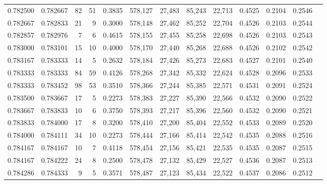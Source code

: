 \begin{tabular}{rrrrrrrrrrrrr}
0.782500 & 0.782667 &    82 &  51 &                                     0.3835 & 578,127 &  27,483 &  85,243 &  22,713 & 0.4525 & 0.2104 & 0.2546 \\
0.782667 & 0.782833 &    21 &   9 &                                     0.3000 & 578,148 &  27,462 &  85,252 &  22,704 & 0.4526 & 0.2103 & 0.2544 \\
0.782857 & 0.782976 &     7 &   6 &                                     0.4615 & 578,155 &  27,455 &  85,258 &  22,698 & 0.4526 & 0.2103 & 0.2543 \\
0.783000 & 0.783101 &    15 &  10 &                                     0.4000 & 578,170 &  27,440 &  85,268 &  22,688 & 0.4526 & 0.2102 & 0.2542 \\
0.783167 & 0.783333 &    14 &   5 &                                     0.2632 & 578,184 &  27,426 &  85,273 &  22,683 & 0.4527 & 0.2101 & 0.2540 \\
0.783333 & 0.783333 &    84 &  59 &                                     0.4126 & 578,268 &  27,342 &  85,332 &  22,624 & 0.4528 & 0.2096 & 0.2533 \\
0.783333 & 0.783452 &    98 &  53 &                                     0.3510 & 578,366 &  27,244 &  85,385 &  22,571 & 0.4531 & 0.2091 & 0.2524 \\
0.783500 & 0.783667 &    17 &   5 &                                     0.2273 & 578,383 &  27,227 &  85,390 &  22,566 & 0.4532 & 0.2090 & 0.2522 \\
0.783667 & 0.783833 &    10 &   6 &                                     0.3750 & 578,393 &  27,217 &  85,396 &  22,560 & 0.4532 & 0.2090 & 0.2521 \\
0.783833 & 0.784000 &    17 &   8 &                                     0.3200 & 578,410 &  27,200 &  85,404 &  22,552 & 0.4533 & 0.2089 & 0.2520 \\
0.784000 & 0.784111 &    34 &  10 &                                     0.2273 & 578,444 &  27,166 &  85,414 &  22,542 & 0.4535 & 0.2088 & 0.2516 \\
0.784167 & 0.784167 &    10 &   7 &                                     0.4118 & 578,454 &  27,156 &  85,421 &  22,535 & 0.4535 & 0.2087 & 0.2515 \\
0.784167 & 0.784222 &    24 &   8 &                                     0.2500 & 578,478 &  27,132 &  85,429 &  22,527 & 0.4536 & 0.2087 & 0.2513 \\
0.784286 & 0.784333 &     9 &   5 &                                     0.3571 & 578,487 &  27,123 &  85,434 &  22,522 & 0.4537 & 0.2086 & 0.2512 \\

\end{tabular}
